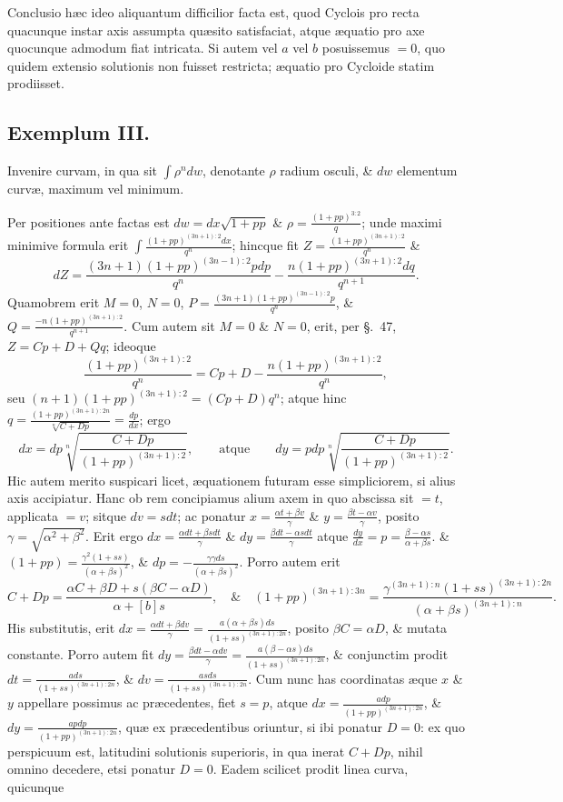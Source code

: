 Conclusio hæc ideo aliquantum difficilior facta est, quod Cyclois pro recta quacunque instar axis assumpta quæsito satisfaciat, atque æquatio pro axe quocunque admodum fiat intricata. Si autem vel $a$ vel $b$ posuissemus $=0$, quo quidem extensio solutionis non fuisset restricta; æquatio pro Cycloide statim prodiisset.

\subsection*{Exemplum III.}
Invenire curvam, in qua sit $\int\rho^n dw$, denotante $\rho$ radium osculi, \& $dw$ elementum curvæ, maximum vel minimum.

Per positiones ante factas est $dw=dx\sqrt{1+pp}$ \& $\rho=\frac{(1+pp)^{3:2}}q$; unde maximi minimive formula erit $\int\frac{(1+pp)^{(3n+1):2}dx}{q^n}$; hincque fit $Z=\frac{(1+pp)^{(3n+1):2}}{q^n}$ \&
\[dZ=\frac{(3n+1)(1+pp)^{(3n-1):2}pdp}{q^n}-\frac{n(1+pp)^{(3n+1):2}dq}{q^{n+1}}.\]
Quamobrem erit $M=0$, $N=0$, $P=\frac{(3n+1)(1+pp)^{(3n-1):2}p}{q^n}$, \& $Q=\frac{-n(1+pp)^{(3n+1):2}}{q^{n+1}}$. Cum autem sit $M=0$ \& $N=0$, erit, per §.~47, $Z=Cp+D+Qq$; ideoque
\[\frac{(1+pp)^{(3n+1):2}}{q^n}=Cp+D-\frac{n(1+pp)^{(3n+1):2}}{q^n},\]
seu $(n+1)(1+pp)^{(3n+1):2}=(Cp+D)q^n$; atque hinc $q=\frac{(1+pp)^{(3n+1):2n}}{\sqrt[n]{C+Dp}}=\frac{dp}{dx}$; ergo
\[dx=dp\sqrt[n]{\frac{C+Dp}{(1+pp)^{(3n+1):2}}},\qquad\text{atque}\qquad dy=pdp\sqrt[n]{\frac{C+Dp}{(1+pp)^{(3n+1):2}}}.\]
Hic autem merito suspicari licet, æquationem futuram esse simpliciorem, si alius axis accipiatur. Hanc ob rem concipiamus alium axem in quo abscissa sit $=t$, applicata $=v$; sitque $dv=sdt$; ac ponatur $x=\frac{\alpha t+\beta v}{\gamma}$ \& $y=\frac{\beta t-\alpha v}{\gamma}$, posito $\gamma=\sqrt{\alpha^2+\beta^2}$. Erit ergo $dx=\frac{\alpha dt+\beta sdt}{\gamma}$ \& $dy=\frac{\beta dt-\alpha sdt}{\gamma}$ atque $\frac{dy}{dx}=p=\frac{\beta-\alpha s}{\alpha+\beta s}$. \& $(1+pp)=\frac{\gamma^2(1+ss)}{(\alpha+\beta s)^2}$, \& $dp=-\frac{\gamma\gamma ds}{(\alpha+\beta s)^2}$. Porro autem erit
\[C+Dp=\frac{\alpha C+\beta D+s(\beta C-\alpha D)}{\alpha+[b]s},\quad\&\quad (1+pp)^{(3n+1):3n}=\frac{\gamma^{(3n+1):n}(1+ss)^{(3n+1):2n}}{(\alpha+\beta s)^{(3n+1):n}}.\]
His substitutis, erit $dx=\frac{\alpha dt+\beta dv}{\gamma}=\frac{a(\alpha+\beta s)ds}{(1+ss)^{(3n+1):2n}}$, posito $\beta C=\alpha D$, \& mutata constante. Porro autem fit $dy=\frac{\beta dt-\alpha dv}{\gamma}=\frac{a(\beta-\alpha s)ds}{(1+ss)^{(3n+1):2n}}$, \& conjunctim prodit $dt=\frac{ads}{(1+ss)^{(3n+1):2n}}$, \& $dv=\frac{asds}{(1+ss)^{(3n+1):2n}}$. Cum nunc has coordinatas æque $x$ \& $y$ appellare possimus ac præcedentes, fiet $s=p$, atque $dx=\frac{adp}{(1+pp)^{(3n+1):2n}}$, \& $dy=\frac{apdp}{(1+pp)^{(3n+1):2n}}$, quæ ex præcedentibus oriuntur, si ibi ponatur $D=0$: ex quo perspicuum est, latitudini solutionis superioris, in qua inerat $C+Dp$, nihil omnino decedere, etsi ponatur $D=0$. Eadem scilicet prodit linea curva, quicunque

